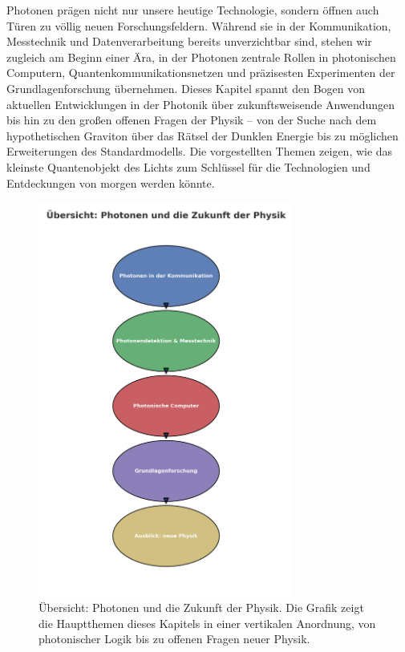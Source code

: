 Photonen prägen nicht nur unsere heutige Technologie, sondern öffnen auch Türen zu völlig neuen Forschungsfeldern. 
Während sie in der Kommunikation, Messtechnik und Datenverarbeitung bereits unverzichtbar sind, stehen wir zugleich am Beginn einer Ära, in der Photonen zentrale Rollen in photonischen Computern, Quantenkommunikationsnetzen und präzisesten Experimenten der Grundlagenforschung übernehmen.  
Dieses Kapitel spannt den Bogen von aktuellen Entwicklungen in der Photonik über zukunftsweisende Anwendungen bis hin zu den großen offenen Fragen der Physik – von der Suche nach dem hypothetischen Graviton über das Rätsel der Dunklen Energie bis zu möglichen Erweiterungen des Standardmodells. 
Die vorgestellten Themen zeigen, wie das kleinste Quantenobjekt des Lichts zum Schlüssel für die Technologien und Entdeckungen von morgen werden könnte.
\begin{figure}[H]
	\centering
	\includegraphics[width=0.75\textwidth]{bilder/kapitel_VII_uebersicht.png}
	\caption[Übersicht Kapitel~VII]{Übersicht: Photonen und die Zukunft der Physik. 
		Die Grafik zeigt die Hauptthemen dieses Kapitels in einer vertikalen Anordnung, 
		von photonischer Logik bis zu offenen Fragen neuer Physik.}
	\label{fig:kapitel_VII_uebersicht}
\end{figure}

